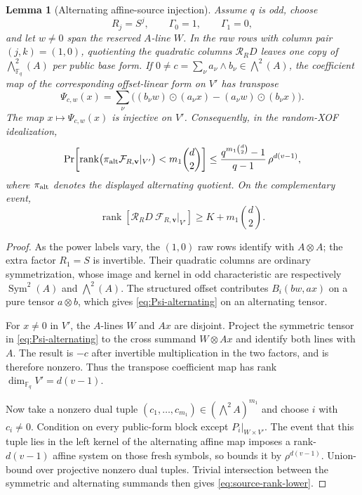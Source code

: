 \documentclass[11pt]{article}
\newtheorem{lemma}[lemma]{Lemma}
\newcommand{\F}{\mathbb F}
\newcommand{\Sym}{\operatorname{Sym}}
\newcommand{\rank}{\operatorname{rank}}
\begin{document}
\begin{lemma}[Alternating affine-source injection]
\label{lem:alternating-source-injection}
Assume $q$ is odd, choose
\begin{equation}\label{eq:preflight-relation-offsets}
 R_j=S^j,\qquad \Gamma_0=1,\qquad \Gamma_1=0,
\end{equation}
and let $w\ne0$ span the reserved $A$-line $W$.  In the raw rows with column
pair $(j,k)=(1,0)$, quotienting the quadratic columns
$\mathcal R_RD$ leaves one copy of $\bigwedge^2_{\F_q}(A)$ per public base
form.  If $0\ne c=\sum_\nu a_\nu\wedge b_\nu\in\bigwedge^2(A)$, the
coefficient map of the corresponding offset-linear form on $V'$ has transpose
\begin{equation}\label{eq:Psi-alternating}
 \Psi_{c,w}(x)=
 \sum_\nu\bigl((b_\nu w)\mathbin\odot(a_\nu x)
                    -(a_\nu w)\mathbin\odot(b_\nu x)\bigr).
\end{equation}
The map $x\mapsto\Psi_{c,w}(x)$ is injective on $V'$.  Consequently, in the
random-XOF idealization,
\begin{equation}\label{eq:source-rank-failure}
 \Pr\!\left[
  \rank\bigl(\pi_{\rm alt}\mathcal F_{R,\mathbf v}|_{V'}\bigr)
       <m_1\binom d2
 \right]
 \le
 \frac{q^{m_1\binom d2}-1}{q-1}\,\rho^{d(v-1)},
\end{equation}
where $\pi_{\rm alt}$ denotes the displayed alternating quotient.  On the
complementary event,
\begin{equation}\label{eq:source-rank-lower}
 \rank[\mathcal R_RD\ \mathcal F_{R,\mathbf v}|_{V'}]
 \ge K+m_1\binom d2.
\end{equation}
\end{lemma}

\begin{proof}
As the power labels vary, the $(1,0)$ raw rows identify with $A\otimes A$;
the extra factor $R_1=S$ is invertible.  Their quadratic columns are ordinary
symmetrization, whose image and kernel in odd characteristic are respectively
$\Sym^2(A)$ and $\bigwedge^2(A)$.  The structured offset contributes
$B_i(bw,ax)$ on a pure tensor $a\otimes b$, which gives
\eqref{eq:Psi-alternating} on an alternating tensor.

For $x\ne0$ in $V'$, the $A$-lines $W$ and $Ax$ are disjoint.  Project the
symmetric tensor in \eqref{eq:Psi-alternating} to the cross summand
$W\otimes Ax$ and identify both lines with $A$.  The result is $-c$ after
invertible multiplication in the two factors, and is therefore nonzero.
Thus the transpose coefficient map has rank $\dim_{\F_q}V'=d(v-1)$.

Now take a nonzero dual tuple
$(c_1,\ldots,c_{m_1})\in(\bigwedge^2A)^{m_1}$ and choose $i$ with
$c_i\ne0$.  Condition on every public-form block except
$P_i|_{W\times V'}$.  The event that this tuple lies in the left kernel of the
alternating affine map imposes a rank-$d(v-1)$ affine system on those fresh
symbols, so  bounds it by
$\rho^{d(v-1)}$.  Union-bound over projective nonzero dual tuples.  Trivial
intersection between the symmetric and alternating summands then gives
\eqref{eq:source-rank-lower}.
\end{proof}
\end{document}
